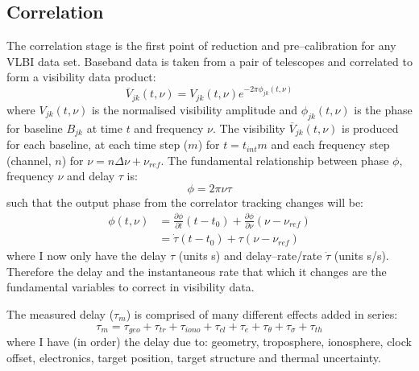 	\subsection{Correlation} \label{sec:correlation}
		The correlation stage is the first point of reduction and pre--calibration for any VLBI data set. Baseband data is taken from a pair of telescopes and correlated to form a visibility data product:
		\begin{equation}
			\overline{V}_{jk}(t,\nu) = V_{jk}(t,\nu)e^{-2\pi\phi_{jk}(t,\nu)}
		\end{equation}
		where $V_{jk}(t,\nu)$ is the normalised visibility amplitude and $\phi_{jk}(t,\nu)$ is the phase for baseline $B_{jk}$ at time $t$ and frequency $\nu$. The visibility $\overline{V}_{jk}(t,\nu)$ is produced for each baseline, at each time step ($m$) for $t=t_{int}m$ and each frequency step (channel, $n$) for $\nu=n\Delta\nu+\nu_{ref}$. The fundamental relationship between phase $\phi$, frequency $\nu$ and delay $\tau$ is:
		\begin{equation}
			\phi = 2\pi\nu\tau
		\end{equation} such that the output phase from the correlator tracking changes will be:
		\begin{equation}
			\begin{split}
				\phi(t,\nu) &= \frac{\partial\phi}{\partial t}(t-t_0) + \frac{\partial\phi}{\partial \nu}(\nu - \nu_{ref}) \\
				&= \dot{\tau}(t-t_0) + \tau(\nu - \nu_{ref})
			\end{split}
		\end{equation} where I now only have the delay $\tau$ (units s) and { delay--rate/rate} $\dot{\tau}$ (units s/s). Therefore the delay and the instantaneous rate that which it changes are the fundamental variables to correct in visibility data. 
		
		The measured delay ($\tau_m$) is comprised of many different effects added in series:
		\begin{equation}
			\tau_m = \tau_{geo}+\tau_{tr}+\tau_{iono}+\tau_{cl}+\tau_e+\tau_\theta+\tau_\sigma+\tau_{th}
		\end{equation} where I have (in order) the delay due to: geometry, troposphere, ionosphere, clock offset, electronics, target position, target structure and thermal uncertainty.
		
